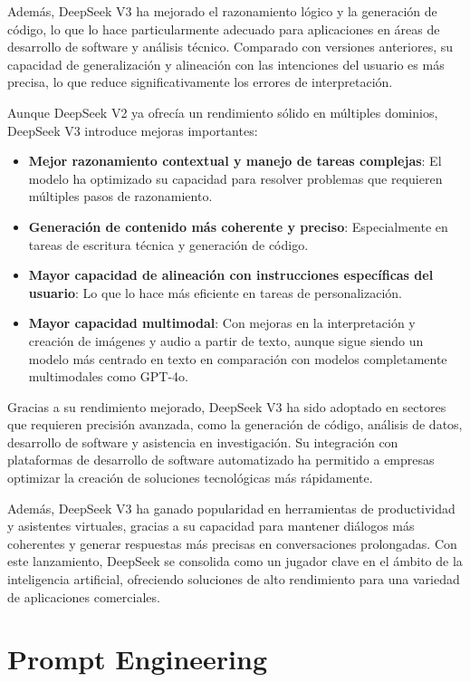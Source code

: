 Además, DeepSeek V3 ha mejorado el razonamiento lógico y la generación de código, lo que lo hace particularmente adecuado para aplicaciones en áreas de desarrollo de software y análisis técnico. 
Comparado con versiones anteriores, su capacidad de generalización y alineación con las intenciones del usuario es más precisa, lo que reduce significativamente los errores de interpretación.

Aunque DeepSeek V2 ya ofrecía un rendimiento sólido en múltiples dominios, DeepSeek V3 introduce mejoras importantes:

\begin{itemize}
    \item \textbf{Mejor razonamiento contextual y manejo de tareas complejas}: El modelo ha optimizado su capacidad para resolver problemas que requieren múltiples pasos de razonamiento.
    \item \textbf{Generación de contenido más coherente y preciso}: Especialmente en tareas de escritura técnica y generación de código.
    \item \textbf{Mayor capacidad de alineación con instrucciones específicas del usuario}: Lo que lo hace más eficiente en tareas de personalización.
    \item \textbf{Mayor capacidad multimodal}: Con mejoras en la interpretación y creación de imágenes y audio a partir de texto, aunque sigue siendo un modelo más centrado en texto en comparación con modelos completamente multimodales como GPT-4o.
\end{itemize}

Gracias a su rendimiento mejorado, DeepSeek V3 ha sido adoptado en sectores que requieren precisión avanzada, como la generación de código, análisis de datos, desarrollo de software y asistencia en investigación. 
Su integración con plataformas de desarrollo de software automatizado ha permitido a empresas optimizar la creación de soluciones tecnológicas más rápidamente.

Además, DeepSeek V3 ha ganado popularidad en herramientas de productividad y asistentes virtuales, gracias a su capacidad para mantener diálogos más coherentes y generar respuestas más precisas en conversaciones prolongadas. 
Con este lanzamiento, DeepSeek se consolida como un jugador clave en el ámbito de la inteligencia artificial, ofreciendo soluciones de alto rendimiento para una variedad de aplicaciones comerciales. 


\section{Prompt Engineering}

